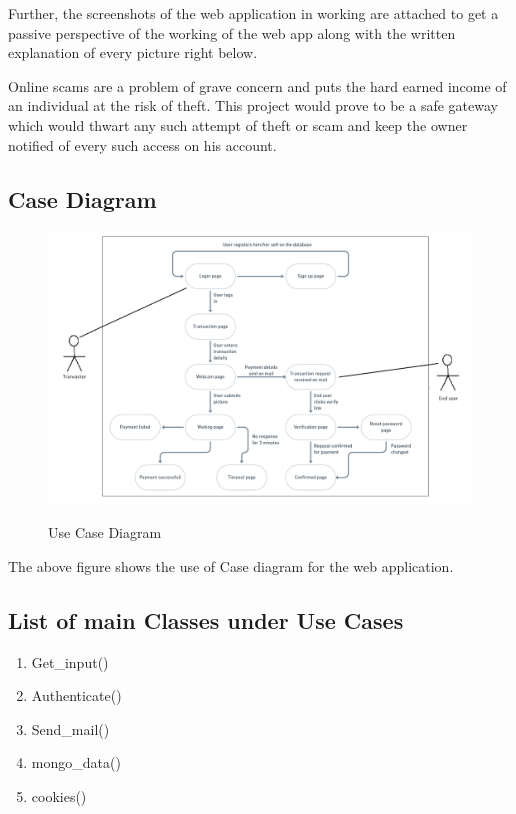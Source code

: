 \documentclass[12pt, oneside, a4paper]{article}
\begin{document}
Further, the screenshots of the web application in working are attached to get a passive perspective of the working of the web app along with the written explanation of every picture right below.

Online scams are a problem of grave concern and puts the hard earned income of an individual at the risk of theft. This project would prove to be a safe gateway which would thwart any such attempt of theft or scam and keep the owner notified of every such access on his account.
\pagebreak

\subsection{Case Diagram}
\vspace{2cm}
\begin{figure}[H]
\begin{center}
\hspace*{-0.9in}
\includegraphics[width=1.3\textwidth]{Figure3.png}\\
\caption{Use Case Diagram}
\label{fig:Figure 3}
\end{center}
\end{figure}

\begin{center}
The above figure shows the use of Case diagram for the web application.
\end{center}

\pagebreak

\subsection{List of main Classes under Use Cases}
\vspace{0.5cm}
\begin{enumerate}
    \itemsep0em
    \item Get\_input()
    \item Authenticate()
    \item Send\_mail()
    \item mongo\_data()
    \item cookies()
\end{enumerate}
\end{document}

